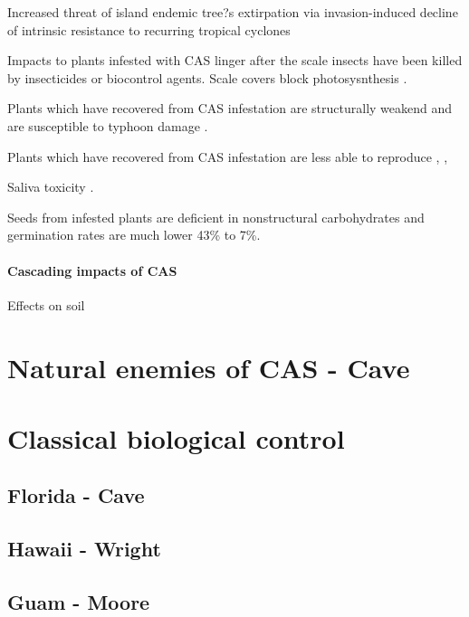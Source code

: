 \documentclass[12pt,letterpaper,english,bibliography=totocnumbered, abstract=on]{scrartcl}
\begin{document}
Increased threat of island endemic tree?s
extirpation via invasion-induced decline of
intrinsic resistance to recurring tropical cyclones

Impacts to plants infested with CAS linger after the scale insects have been killed by insecticides or biocontrol agents. Scale covers block photosysnthesis \parencite{tangReportRecommendationsCycad2005a}.

Plants which have recovered from CAS infestation are structurally weakend and are susceptible to typhoon damage \parencite{marlerIncreasedThreatIsland2013}.

Plants which have recovered from CAS infestation are less able to reproduce \parencite{marlerAulacaspisYasumatsuiInvasion2021}, \parencite{marlerAulacaspisYasumatsuiInvasion2021},

Saliva toxicity \parencite{muniappanCycadAulacaspisScale2012}.

Seeds from infested plants are deficient in nonstructural carbohydrates \parencite{marlerSourceSinkRelations2019} and germination rates are much lower 43\% to 7\%.

\paragraph{Cascading impacts of CAS}

Effects on soil \cite{marlerTwoCycadSpecies2020}


\cite{haynesExoticInvasivePest2005}



\section{Natural enemies of CAS - Cave}

\section{Classical biological control}

\subsection{Florida - Cave}

\subsection{Hawaii - Wright}

\subsection{Guam - Moore}
\end{document}
